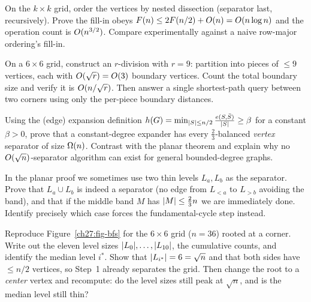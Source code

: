 \begin{exercise}\label{ch27:ex-nd}
On the $k\times k$ grid, order the vertices by nested dissection (separator last, recursively). Prove the fill-in obeys $F(n)\le 2F(n/2)+O(n)=O(n\log n)$ and the operation count is $O(n^{3/2})$. Compare experimentally against a naive row-major ordering's fill-in.
\end{exercise}

\begin{exercise}\label{ch27:ex-rdiv}
On a $6\times 6$ grid, construct an $r$-division with $r=9$: partition into pieces of $\le 9$ vertices, each with $O(\sqrt r)=O(3)$ boundary vertices. Count the total boundary size and verify it is $O(n/\sqrt r)$. Then answer a single shortest-path query between two corners using only the per-piece boundary distances.
\end{exercise}

\begin{exercise}\label{ch27:ex-exp}
Using the (edge) expansion definition $h(G)=\min_{\lvert S\rvert\le n/2}\frac{e(S,\bar S)}{\lvert S\rvert}\ge \beta$ for a constant $\beta>0$, prove that a constant-degree expander has every $\tfrac23$-balanced \emph{vertex} separator of size $\Omega(n)$. Contrast with the planar theorem and explain why no $O(\sqrt n)$-separator algorithm can exist for general bounded-degree graphs.
\end{exercise}

\begin{exercise}\label{ch27:ex-twolevels}
In the planar proof we sometimes use two thin levels $L_a,L_b$ as the separator. Prove that $L_a\cup L_b$ is indeed a separator (no edge from $L_{<a}$ to $L_{>b}$ avoiding the band), and that if the middle band $M$ has $\lvert M\rvert\le\tfrac23 n$ we are immediately done. Identify precisely which case forces the fundamental-cycle step instead.
\end{exercise}

\begin{exercise}\label{ch27:ex-trace-bfs}
Reproduce Figure~\ref{ch27:fig-bfs} for the $6\times6$ grid ($n=36$) rooted at a corner. Write out the eleven level sizes $\lvert L_0\rvert,\dots,\lvert L_{10}\rvert$, the cumulative counts, and identify the median level $i^*$. Show that $\lvert L_{i^*}\rvert=6=\sqrt n$ and that both sides have $\le n/2$ vertices, so Step~1 already separates the grid. Then change the root to a \emph{center} vertex and recompute: do the level sizes still peak at $\sqrt n$, and is the median level still thin?
\end{exercise}

